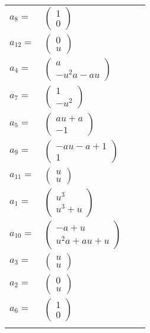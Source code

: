 \documentclass[1p]{elsarticle_modified}
\theoremstyle{definition}
\begin{document}
\begin{tabular}{m{7pt} m{180pt} m{7pt} m{180pt} }
\flushright $a_{8}=$&$\begin{pmatrix}1\\0\end{pmatrix}$ \\
\flushright $a_{12}=$&$\begin{pmatrix}0\\u\end{pmatrix}$ \\
\flushright $a_{4}=$&$\begin{pmatrix}a\\- u^2 a- a u\end{pmatrix}$ \\
\flushright $a_{7}=$&$\begin{pmatrix}1\\- u^2\end{pmatrix}$ \\
\flushright $a_{5}=$&$\begin{pmatrix}a u+a\\-1\end{pmatrix}$ \\
\flushright $a_{9}=$&$\begin{pmatrix}- a u- a+1\\1\end{pmatrix}$ \\
\flushright $a_{11}=$&$\begin{pmatrix}u\\u\end{pmatrix}$ \\
\flushright $a_{1}=$&$\begin{pmatrix}u^3\\u^3+u\end{pmatrix}$ \\
\flushright $a_{10}=$&$\begin{pmatrix}- a+u\\u^2 a+a u+u\end{pmatrix}$ \\
\flushright $a_{3}=$&$\begin{pmatrix}u\\u\end{pmatrix}$ \\
\flushright $a_{2}=$&$\begin{pmatrix}0\\u\end{pmatrix}$ \\
\flushright $a_{6}=$&$\begin{pmatrix}1\\0\end{pmatrix}$\\&\end{tabular}
\end{document}
